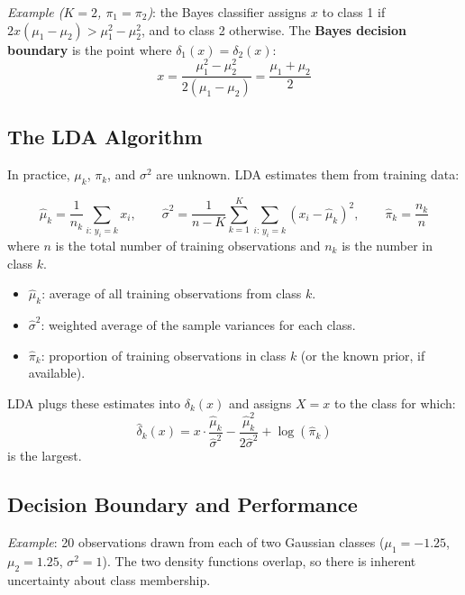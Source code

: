 \documentclass[11pt,a4paper]{article}
\theoremstyle{definition}
\theoremstyle{plain}
\theoremstyle{remark}
\begin{document}
\textit{Example ($K = 2$, $\pi_1 = \pi_2$)}: the Bayes classifier assigns $x$ to class 1 if $2x(\mu_1 - \mu_2) > \mu_1^2 - \mu_2^2$, and to class 2 otherwise. The \textbf{Bayes decision boundary} is the point where $\delta_1(x) = \delta_2(x)$:
\[
    x = \frac{\mu_1^2 - \mu_2^2}{2(\mu_1 - \mu_2)} = \frac{\mu_1 + \mu_2}{2}
\]

\subsection{The LDA Algorithm}

In practice, $\mu_k$, $\pi_k$, and $\sigma^2$ are unknown. LDA estimates them from training data:

\begin{tcolorbox}[colback=blue!5!white,colframe=blue!75!black,title=\textbf{LDA Parameter Estimates}]
\[
    \hat{\mu}_k = \frac{1}{n_k} \sum_{i:\, y_i = k} x_i, \qquad
    \hat{\sigma}^2 = \frac{1}{n - K} \sum_{k=1}^{K} \sum_{i:\, y_i = k} (x_i - \hat{\mu}_k)^2, \qquad
    \hat{\pi}_k = \frac{n_k}{n}
\]
where $n$ is the total number of training observations and $n_k$ is the number in class $k$.
\end{tcolorbox}

\begin{itemize}
    \item $\hat{\mu}_k$: average of all training observations from class $k$.
    \item $\hat{\sigma}^2$: weighted average of the sample variances for each class.
    \item $\hat{\pi}_k$: proportion of training observations in class $k$ (or the known prior, if available).
\end{itemize}

LDA plugs these estimates into $\delta_k(x)$ and assigns $X = x$ to the class for which:
\[
    \hat{\delta}_k(x) = x \cdot \frac{\hat{\mu}_k}{\hat{\sigma}^2} - \frac{\hat{\mu}_k^2}{2\hat{\sigma}^2} + \log(\hat{\pi}_k)
\]
is the largest.

\subsection{Decision Boundary and Performance}

\textit{Example}: 20 observations drawn from each of two Gaussian classes ($\mu_1 = -1.25$, $\mu_2 = 1.25$, $\sigma^2 = 1$). The two density functions overlap, so there is inherent uncertainty about class membership.
\end{document}
